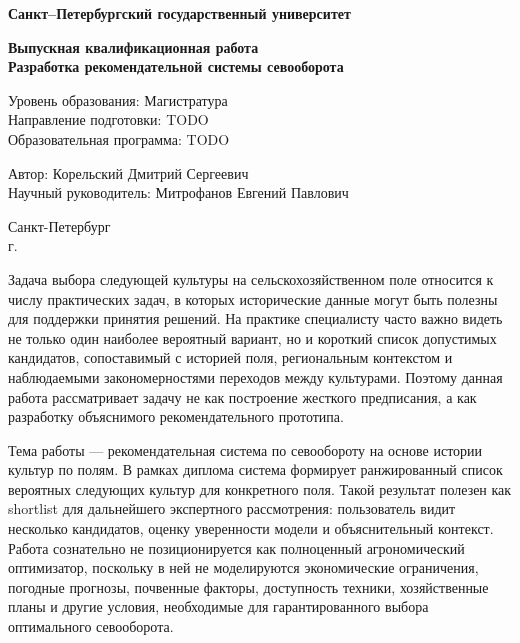 \documentclass[a4paper,article,14pt]{extarticle}
\begin{document}
\begin{titlepage}
\begin{center}
\textbf{Санкт--Петербургский государственный университет}

\vspace{35mm}

\textbf{\large Выпускная квалификационная работа}\\[3mm]
\textbf{\large Разработка рекомендательной системы севооборота}

\vspace{20mm}
Уровень образования: Магистратура\\
Направление подготовки: TODO\\
Образовательная программа: TODO

\vspace{25mm}
\begin{flushright}
\begin{minipage}[t]{0.65\textwidth}
Автор: Корельский Дмитрий Сергеевич\\
Научный руководитель: Митрофанов Евгений Павлович
\end{minipage}
\end{flushright}

\vfill
Санкт-Петербург\\
\the\year{} г.
\end{center}
\end{titlepage}

\tableofcontents
\pagebreak


Задача выбора следующей культуры на сельскохозяйственном поле относится к числу практических задач, в которых исторические данные могут быть полезны для поддержки принятия решений. На практике специалисту часто важно видеть не только один наиболее вероятный вариант, но и короткий список допустимых кандидатов, сопоставимый с историей поля, региональным контекстом и наблюдаемыми закономерностями переходов между культурами. Поэтому данная работа рассматривает задачу не как построение жесткого предписания, а как разработку объяснимого рекомендательного прототипа.

Тема работы --- рекомендательная система по севообороту на основе истории культур по полям. В рамках диплома система формирует ранжированный список вероятных следующих культур для конкретного поля. Такой результат полезен как shortlist для дальнейшего экспертного рассмотрения: пользователь видит несколько кандидатов, оценку уверенности модели и объяснительный контекст. Работа сознательно не позиционируется как полноценный агрономический оптимизатор, поскольку в ней не моделируются экономические ограничения, погодные прогнозы, почвенные факторы, доступность техники, хозяйственные планы и другие условия, необходимые для гарантированного выбора оптимального севооборота.
\end{document}
